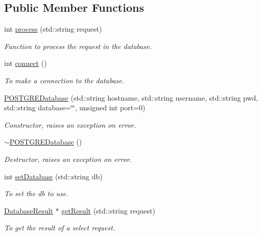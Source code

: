 \subsection*{Public Member Functions}
\begin{DoxyCompactItemize}
\item 
int \hyperlink{classPOSTGREDatabase_a0371d887a489418bed525acb0d9c5eb3}{process} (std::string request)
\begin{DoxyCompactList}\small\item\em Function to process the request in the database. \item\end{DoxyCompactList}\item 
int \hyperlink{classPOSTGREDatabase_a758b0d66ddda58296932242533000846}{connect} ()
\begin{DoxyCompactList}\small\item\em To make a connection to the database. \item\end{DoxyCompactList}\item 
\hyperlink{classPOSTGREDatabase_adbdbad8b33beb05a5b6cdaae17d252cd}{POSTGREDatabase} (std::string hostname, std::string username, std::string pwd, std::string database=\char`\"{}\char`\"{}, unsigned int port=0)
\begin{DoxyCompactList}\small\item\em Constructor, raises an exception on error. \item\end{DoxyCompactList}\item 
\hypertarget{classPOSTGREDatabase_a455249ba891bb36b51ea2fb67f5043bf}{
\hyperlink{classPOSTGREDatabase_a455249ba891bb36b51ea2fb67f5043bf}{$\sim$POSTGREDatabase} ()}
\label{classPOSTGREDatabase_a455249ba891bb36b51ea2fb67f5043bf}

\begin{DoxyCompactList}\small\item\em Destructor, raises an exception on error. \item\end{DoxyCompactList}\item 
int \hyperlink{classPOSTGREDatabase_acadff2a3649a40b323eb7711e0d705cf}{setDatabase} (std::string db)
\begin{DoxyCompactList}\small\item\em To set the db to use. \item\end{DoxyCompactList}\item 
\hyperlink{classDatabaseResult}{DatabaseResult} $\ast$ \hyperlink{classPOSTGREDatabase_a4be2769e7d13be7f139b540ffb3a4760}{getResult} (std::string request)
\begin{DoxyCompactList}\small\item\em To get the result of a select request. \item\end{DoxyCompactList}\end{DoxyCompactItemize}
